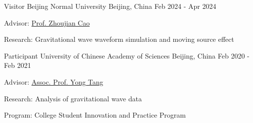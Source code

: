 

\begin{cventries}

  \cventry
    {Visitor} %
    {Beijing Normal University} %
    {Beijing, China} %
    {Feb 2024 - Apr 2024} %
    {
      \begin{cvitems} %
        \item{Advisor: \href{https://inspirehep.net/authors/1060083?ui-citation-summary=true&ui-exclude-self-citations=true}{Prof. Zhoujian Cao}}
        \item{Research: Gravitational wave waveform simulation and moving source effect}
      \end{cvitems}
    }

  \cventry
    {Participant} %
    {University of Chinese Academy of Sciences} %
    {Beijing, China} %
    {Feb 2020 - Feb 2021} %
    {
      \begin{cvitems} %
        \item{Advisor: \href{https://inspirehep.net/authors/1040919?ui-citation-summary=true&ui-exclude-self-citations=true}{Assoc. Prof. Yong Tang}}
        \item{Research: Analysis of gravitational wave data}
        \item{Program: College Student Innovation and Practice Program}
      \end{cvitems}
    }

\end{cventries}

